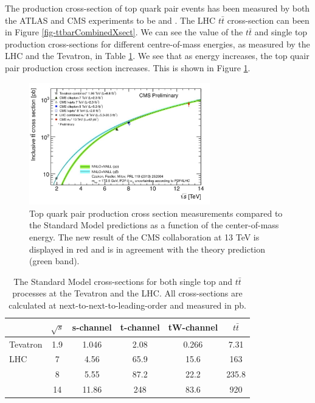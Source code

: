 The production cross-section of top quark pair events has been measured by both the ATLAS and CMS experiments to be  \cite{} and \cite{}. The LHC $t\bar{t}$ cross-section can been in Figure \ref{fig-ttbarCombinedXsect}. We can see the value of the $t\bar{t}$ and single top production cross-sections for different centre-of-mass energies, as measured by the LHC and the Tevatron, in Table \ref{tab-ttbarcrosssections}. We see that as energy increases, the top quair pair production cross section increases. This is shown in Figure \ref{fig-ttbarXsectPlot}.

\begin{figure}
\begin{center}
\includegraphics[width=0.7\textwidth]{Figures/ttbarXsectPlot.png}
\end{center}
\caption{Top quark pair production cross section measurements compared to the Standard Model predictions as a function of the center-of-mass energy. The new result of the CMS collaboration at 13 TeV is displayed in red and is in agreement with the theory prediction (green band). \cite{ttbarXsectPlot}}
\label{fig-ttbarXsectPlot}
\end{figure}

\begin{table}
\begin{center}
\begin{tabular}{lccccc}
\hline
\hline
& \textbf{$\sqrt{s}$} & \textbf{s-channel} & \textbf{t-channel} & \textbf{tW-channel} & \textbf{$t\bar{t}$} \\
\hline
Tevatron & 1.9 & 1.046 & 2.08 & 0.266 & 7.31 \\
LHC & 7 & 4.56 & 65.9 & 15.6 & 163 \\ 
 & 8 & 5.55 & 87.2 & 22.2 & 235.8 \\
 & 14 & 11.86 & 248 & 83.6 & 920 \\
\hline
\hline
\end{tabular}
\end{center}
\caption{The Standard Model cross-sections for both single top and $t\bar{t}$ processes at the Tevatron and the LHC. All cross-sections are calculated at next-to-next-to-leading-order and measured in pb. \cite{Czakon:2013goa}}
\label{tab-ttbarcrosssections}
\end{table}

